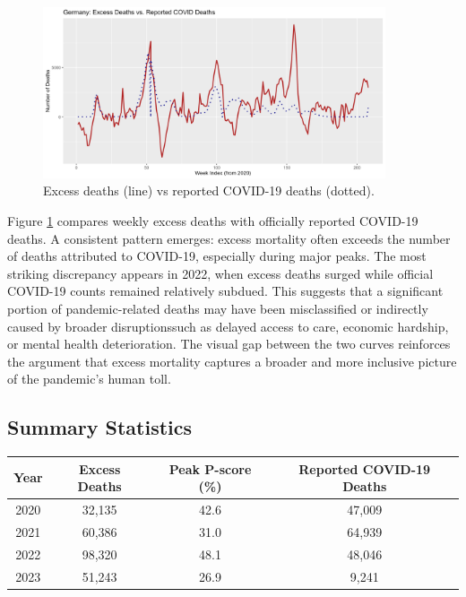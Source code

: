 \documentclass[a4paper,11pt]{article}
\begin{document}
\begin{figure}[h]
\centering
\includegraphics[width=0.9\textwidth]{Figure4-germany-excess-vs-covid.png}
\caption{Excess deaths (line) vs reported COVID-19 deaths (dotted).}\label{f4}
\end{figure}

Figure \ref{f4} compares weekly excess deaths with officially reported COVID-19 deaths. A consistent pattern emerges: excess mortality often exceeds the number of deaths attributed to COVID-19, especially during major peaks. The most striking discrepancy appears in 2022, when excess deaths surged while official COVID-19 counts remained relatively subdued. This suggests that a significant portion of pandemic-related deaths may have been misclassified or indirectly caused by broader disruptions\textemdash such as delayed access to care, economic hardship, or mental health deterioration. The visual gap between the two curves reinforces the argument that excess mortality captures a broader and more inclusive picture of the pandemic’s human toll.

\subsection{Summary Statistics}

\begin{center}
\begin{tabular}{|c|c|c|c|}
\hline
\textbf{Year} & \textbf{Excess Deaths} & \textbf{Peak P-score (\%)} & \textbf{Reported COVID-19 Deaths} \\
\hline
2020 & 32,135 & 42.6 & 47,009 \\
2021 & 60,386 & 31.0 & 64,939 \\
2022 & 98,320 & 48.1 & 48,046 \\
2023 & 51,243 & 26.9 & 9,241 \\
\hline
\end{tabular}
\end{center}
\end{document}
